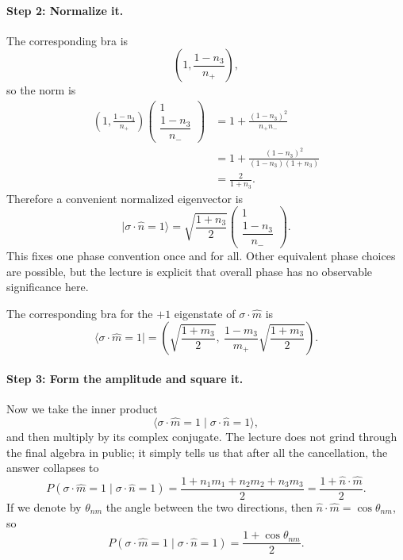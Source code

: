 \paragraph{Step 2: Normalize it.}
The corresponding bra is
\begin{equation}
\left(
1,\frac{1-n_3}{n_+}
\right),
\end{equation}
so the norm is
\begin{align}
\left(
1,\frac{1-n_3}{n_+}
\right)
\begin{pmatrix}
1\\[4pt]
\dfrac{1-n_3}{n_-}
\end{pmatrix}
&=
1+\frac{(1-n_3)^2}{n_+n_-} \\
&=
1+\frac{(1-n_3)^2}{(1-n_3)(1+n_3)} \\
&=
\frac{2}{1+n_3}.
\end{align}
Therefore a convenient normalized eigenvector is
\begin{equation}
|\sigma\cdot\hat n=1\rangle
=
\sqrt{\frac{1+n_3}{2}}
\begin{pmatrix}
1\\[6pt]
\dfrac{1-n_3}{n_-}
\end{pmatrix}.
\end{equation}
This fixes one phase convention once and for all. Other equivalent phase choices are possible, but the lecture is explicit that overall phase has no observable significance here.

The corresponding bra for the \(+1\) eigenstate of \(\sigma\cdot\hat m\) is
\begin{equation}
\langle \sigma\cdot\hat m=1|
=
\left(
\sqrt{\frac{1+m_3}{2}},
\ 
\frac{1-m_3}{m_+}\sqrt{\frac{1+m_3}{2}}
\right).
\end{equation}

\paragraph{Step 3: Form the amplitude and square it.}
Now we take the inner product
\begin{equation}
\langle \sigma\cdot\hat m=1 \mid \sigma\cdot\hat n=1\rangle,
\end{equation}
and then multiply by its complex conjugate. The lecture does not grind through the final algebra in public; it simply tells us that after all the cancellation, the answer collapses to
\begin{equation}
P(\sigma\cdot\hat m=1 \mid \sigma\cdot\hat n=1)
=
\frac{1+n_1m_1+n_2m_2+n_3m_3}{2}
=
\frac{1+\hat n\cdot\hat m}{2}.
\end{equation}
If we denote by \(\theta_{nm}\) the angle between the two directions, then \(\hat n\cdot\hat m=\cos\theta_{nm}\), so
\begin{equation}
P(\sigma\cdot\hat m=1 \mid \sigma\cdot\hat n=1)
=
\frac{1+\cos\theta_{nm}}{2}.
\end{equation}

